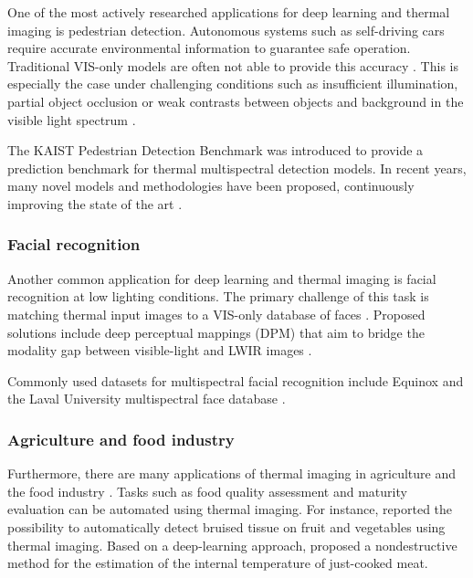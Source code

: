 \documentclass{l4proj}
\begin{document}
One of the most actively researched applications for deep learning and thermal imaging is pedestrian detection. Autonomous systems such as self-driving cars require accurate environmental information to guarantee safe operation. Traditional VIS-only models are often not able to provide this accuracy \citep{zhang_how_2016}. This is especially the case under challenging conditions such as insufficient illumination, partial object occlusion or weak contrasts between objects and background in the visible light spectrum \citep{konig_fully_2017}. 

The KAIST Pedestrian Detection Benchmark \citep{hwang_multispectral_2015} was introduced to provide a prediction benchmark for thermal multispectral detection models. In recent years, many novel models and methodologies have been proposed, continuously improving the state of the art \citep{wagner_multispectral_2016, konig_fully_2017, guan_fusion_2019}.

\subsubsection{Facial recognition}

Another common application for deep learning and thermal imaging is facial recognition at low lighting conditions. The primary challenge of this task is matching thermal input images to a VIS-only database of faces \citep{choi_thermal_2012}. Proposed solutions include deep perceptual mappings (DPM) that aim to bridge the modality gap between visible-light and LWIR images \citep{sarfraz_deep_2017}. 

Commonly used datasets for multispectral facial recognition include Equinox \citep{selinger_appearance-based_2006} and the Laval University multispectral face database \citep{akhloufi_multispectral_2009}.

\subsubsection{Agriculture and food industry}

Furthermore, there are many applications of thermal imaging in agriculture and the food industry \citep{vadivambal_applications_2011}. Tasks such as food quality assessment and maturity evaluation can be automated using thermal imaging. For instance, \citet{gowen_applications_2010} reported the possibility to automatically detect bruised tissue on fruit and vegetables using thermal imaging. Based on a deep-learning approach, \citet{ibarra_combined_2000} proposed a nondestructive method for the estimation of the internal temperature of just-cooked meat. 
\end{document}
